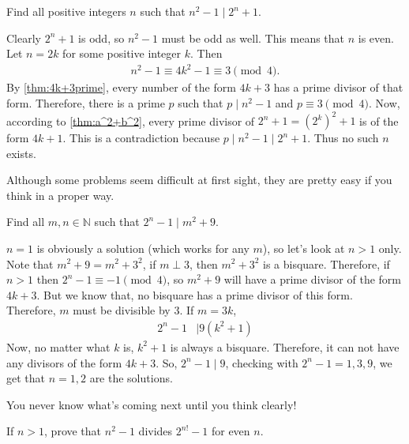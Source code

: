 \documentclass[problems.tex]{subfile}
\begin{document}
	\begin{problem}
		Find all positive integers $n$ such that $n^2-1\mid 2^n+1$.
	\end{problem}

	\begin{solution}
		Clearly $2^n+1$ is odd, so $n^2-1$ must be odd as well. This means that $n$ is even. Let $n=2k$ for some positive integer $k$. Then
			\begin{align*}
				n^2-1 \equiv 4k^2 - 1 \equiv 3 \pmod 4.
			\end{align*}
		By \autoref{thm:4k+3prime}, every number of the form $4k+3$ has a prime divisor of that form. Therefore, there is a prime $p$ such that $p\mid n^2-1$ and $p \equiv 3 \pmod 4$. Now, according to \autoref{thm:a^2+b^2}, every prime divisor of $2^{n}+1=\left(2^{k}\right)^2 + 1$ is of the form $4k+1$. This is a contradiction because $p\mid n^2-1\mid 2^n+1$. Thus no such $n$ exists.
	\end{solution}

	\begin{note}
		Although some problems seem difficult at first sight, they are pretty easy if you think in a proper way.
	\end{note}

	\begin{problem}
		Find all $m,n\in\mathbb{N}$ such that $2^n-1\mid m^2+9$.
	\end{problem}

	\begin{solution}
		$n=1$ is obviously a solution (which works for any $m$), so let's look at $n>1$ only. Note that $m^2+9=m^2+3^2$, if $m\perp3$, then $m^2+3^2$ is a bisquare. Therefore, if $n>1$ then $2^n-1\equiv-1\pmod4$, so $m^2+9$ will have a prime divisor of the form $4k+3$. But we know that, no bisquare has a prime divisor of this form. Therefore, $m$ must be divisible by $3$. If $m=3k$,
		\begin{align*}
		2^n-1 & \mid 9(k^2+1)
		\end{align*}
		Now, no matter what $k$ is, $k^2+1$ is always a bisquare. Therefore, it can not have any divisors of the form $4k+3$. So, $2^n-1\mid 9$, checking with $2^n-1=1,3,9$, we get that $n=1,2$ are the solutions.
	\end{solution}
You never know what's coming next until you think clearly!
	\begin{problem}
		If $n>1$, prove that $n^2-1$ divides $2^{n!}-1$ for even $n$.
	\end{problem}
\end{document}
